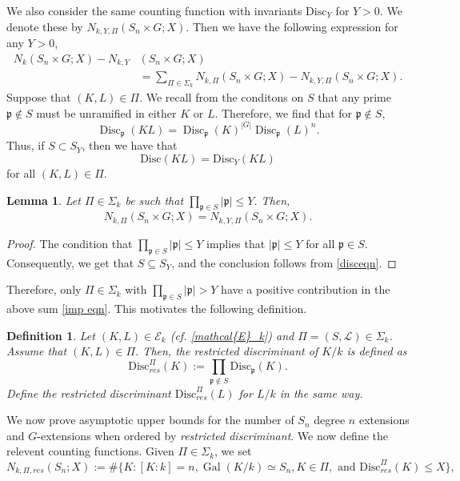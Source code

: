\documentclass[11pt]{amsart}
\newtheorem{Lemma}[theorem]{Lemma}
\newtheorem{definition}[theorem]{Definition}
\newcommand{\fp}{\mathfrak{p}}
\newcommand{\disc}{\mathrm{Disc}}
\newcommand{\op}[1]{\operatorname{#1}}
\numberwithin{equation}{section}
\begin{document}
We also consider the same counting function with invariants $\disc_Y$ for $Y > 0$. We denote these by $N_{k,Y,\Pi}(S_n\times G; X)$. Then we have the following expression for any $Y > 0$,
\begin{equation}\label{decomp_diff}
    \begin{split}
        N_{k}(S_n\times G; X)-N_{k, Y}&(S_n\times G; X) \\
         &= \sum_{\Pi \in \Sigma_k} N_{k,\Pi}(S_n\times G; X)-N_{k,Y,\Pi}(S_n\times G; X).
    \end{split}
\end{equation}
Suppose that $(K,L)\in \Pi$. We recall from the conditons on $S$ that any prime $\fp\notin S$ must be unramified in either $K$ or $L$. Therefore, we find that for $\fp\notin S$, 
\[\op{Disc}_{\fp}(KL)=\op{Disc}_{\fp}(K)^{|G|} \op{Disc}_{\fp}(L)^{n}. \]
Thus, if $S \subset S_Y$, then we have that \begin{equation}\label{disceqn}\disc(KL)=\disc_Y(KL)\end{equation} for all $(K,L) \in \Pi$.
\begin{Lemma}
    Let $\Pi\in \Sigma_k$ be such that $\prod_{\fp\in S}|\fp| \leq Y$. Then, \[ N_{k,\Pi}(S_n\times G; X)= N_{k,Y,\Pi}(S_n\times G; X).\]
\end{Lemma}
\begin{proof}
 The condition that $\prod_{\fp\in S} |\fp|\leq Y$ implies that $|\fp|\leq Y$ for all $\fp\in S$. Consequently, we get that $S\subseteq S_Y$, and the conclusion follows from \eqref{disceqn}.
\end{proof}
Therefore, only $\Pi \in \Sigma_k$ with $\prod_{\fp\in S}|\fp| > Y$ have a positive contribution in the above sum \eqref{imp eqn}. This motivates the following definition.
\begin{definition}\label{res disc}
    Let $(K,L) \in \mathcal{E}_k$ (cf. \eqref{mathcal{E}_k}) and $\Pi=(S, \mathcal{L})\in \Sigma_k$. Assume that $(K, L) \in \Pi$. Then, the \emph{restricted discriminant} of $K/k$ is defined as
    \[
    \disc_{res}^{\Pi}(K):= \prod_{\fp \notin S}\disc_{\fp}(K).
    \]
    Define the restricted discriminant $\disc_{res}^{\Pi}(L)$ for $L/k$ in the same way.
\end{definition}
We now prove asymptotic upper bounds for the number of $S_n$ degree $n$ extensions and $G$-extensions when ordered by \textit{restricted discriminant}. We now define the relevent counting functions. Given $\Pi \in \Sigma_k$, we set
\[
N_{k,\Pi,res}(S_n; X):= \#\{K: [K:k]=n, \op{Gal}(K/k)\simeq S_n, K \in \Pi, \text{ and }\disc_{res}^\Pi(K) \leq X\},
\]
\end{document}
